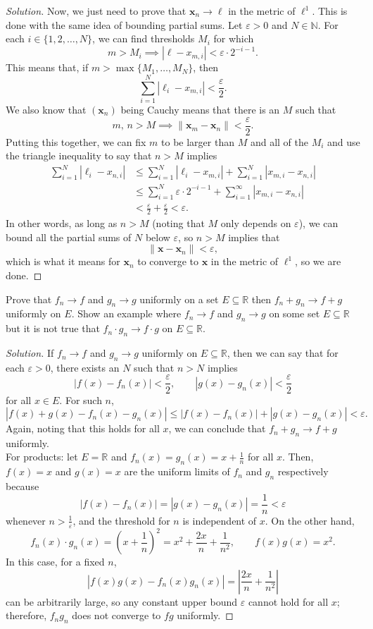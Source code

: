 \documentclass[11pt]{scrartcl}
\providecommand{\eps}{\varepsilon}
\providecommand{\NN}{\mathbb N}
\providecommand{\RR}{\mathbb R}
\providecommand{\mb}[1]{\mathbf{#1}}
\newenvironment{soln}{\begin{proof}[Solution]}{\end{proof}}
\providecommand{\abs}[1]{\left|#1\right|}
\begin{document}
\begin{soln}
	Now, we just need to prove that $\mb x_n\to \ell$
	in the metric of $\ell^1$. This is done with the same idea
	of bounding partial sums. Let $\eps>0$ and $N\in\NN$.
	For each $i\in\{1, 2, \dots, N\}$, we can find
	thresholds $M_i$ for which
	\[m > M_i \implies |\ell - x_{m,i}| < \eps\cdot 2^{-i - 1}.\]
	This means that, if $m > \max\{M_1, \dots, M_N\}$, then
	\[\sum_{i=1}^N |\ell_i - x_{m,i}| < \frac\eps2.\]
	We also know that $(\mb x_n)$ being Cauchy means that
	there is an $M$ such that
	\[m,\,n > M \implies \|\mb x_m - \mb x_n\| < \frac\eps2.\]
	Putting this together, we can fix
	$m$ to be larger than $M$ and all of the $M_i$
	and use the triangle inequality to say that
	$n > M$ implies
	\begin{align*}
		\sum_{i=1}^N |\ell_i - x_{n,i}| &\le
		\sum_{i=1}^N |\ell_i - x_{m,i}| + \sum_{i=1}^N |x_{m,i} - x_{n,i}|\\
		&\le \sum_{i=1}^N \eps\cdot 2^{-i-1} +
		\sum_{i=1}^\infty |x_{m,i} - x_{n,i}|\\
		&< \frac\eps2 + \frac\eps2 < \eps.
	\end{align*}
	In other words, as long as $n > M$ (noting that $M$ only depends on $\eps$),
	we can bound all the partial sums of $N$ below $\eps$,
	so $n > M$ implies that
	\[\|\mb x - \mb x_n\| < \eps,\]
	which is what it means for $\mb x_n$ to converge to $\mb x$
	in the metric of $\ell^1$, so we are done.
\end{soln}

\begin{problem}
	Prove that $f_n\to f$ and $g_n\to g$ uniformly on a set $E\subseteq\RR$
	then $f_n + g_n \to f + g$ uniformly on $E$.
	Show an example where $f_n\to f$ and $g_n\to g$ on some set
	$E\subseteq\RR$ but it is not true that
	$f_n\cdot g_n\to f\cdot g$ on $E\subseteq\RR$.
\end{problem}

\begin{soln}
	If $f_n\to f$ and $g_n\to g$ uniformly on $E\subseteq\RR$,
	then we can say that for each $\eps > 0$, there exists an $N$ such that
	$n > N$ implies
	\[|f(x) - f_n(x)| < \frac\eps2,\qquad |g(x) - g_n(x)| < \frac\eps2\]
	for all $x\in E$. For such $n$,
	\[|f(x) + g(x) - f_n(x) - g_n(x)| \le |f(x) - f_n(x)| + |g(x) - g_n(x)|
	< \eps.\]
	Again, noting that this holds for all $x$, we can conclude that
	$f_n + g_n\to f + g$ uniformly.\\
	
	For products:
	let $E = \RR$ and $f_n(x) = g_n(x) = x + \frac 1n$ for all $x$.
	Then, $f(x) = x$ and $g(x) = x$ are the uniform limits
	of $f_n$ and $g_n$ respectively because
	\[|f(x) - f_n(x)| = |g(x) - g_n(x)| = \frac 1n < \eps\]
	whenever $n > \frac 1\eps$, and the threshold for $n$ is independent of $x$.
	On the other hand,
	\[f_n(x)\cdot g_n(x) = \left(x + \frac 1n\right)^2
	= x^2 + \frac{2x}{n} + \frac{1}{n^2},\qquad
	f(x)g(x) = x^2.\]
	In this case, for a fixed $n$,
	\[|f(x)g(x) - f_n(x)g_n(x)| =
	\abs{\frac{2x}{n} + \frac{1}{n^2}}\]
	can be arbitrarily large, so any constant upper bound $\eps$
	cannot hold for all $x$; therefore, $f_ng_n$ does not
	converge to $fg$ uniformly.
\end{soln}
\end{document}
